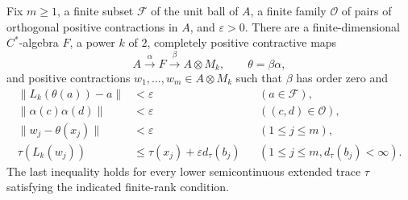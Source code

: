 \begin{lemma}
 \label{model:finite-stage}
Fix $m\geq1$, a finite subset $\mathcal F$ of the unit ball of $A$,
a finite family $\mathcal O$ of pairs of orthogonal positive
contractions in $A$, and $\varepsilon>0$.  There are a
finite-dimensional $C^*$-algebra $F$, a power $k$ of $2$, completely
positive contractive maps
\[
 A\xrightarrow{\alpha}F\xrightarrow{\beta}A\otimes M_k,
 \qquad\theta=\beta\alpha,
\]
and positive contractions $w_1,\ldots,w_m\in A\otimes M_k$ such
that $\beta$ has order zero and
\begin{align}
 \|L_k(\theta(a))-a\|&<\varepsilon
       &&(a\in\mathcal F), \label{model:finite-approx}\\
 \|\alpha(c)\alpha(d)\|&<\varepsilon
       &&((c,d)\in\mathcal O), \label{model:finite-orth}\\
 \|w_j-\theta(x_j)\|&<\varepsilon
       &&(1\leq j\leq m), \label{model:finite-retained}\\
 \tau(L_k(w_j))&\leq\tau(x_j)+\varepsilon d_\tau(b_j)
       &&(1\leq j\leq m, d_\tau(b_j)<\infty).
       \label{model:finite-trace}
\end{align}
The last inequality holds for every lower semicontinuous extended
trace $\tau$ satisfying the indicated finite-rank condition.
\end{lemma}

